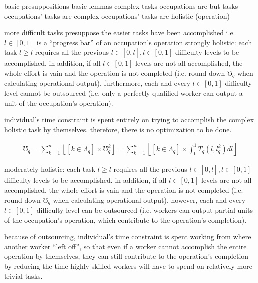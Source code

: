 \documentclass[hidelinks, nonatbib]{elsarticle}
\begin{document}
basic presuppositions
basic lemmas
complex tasks
occupations are but tasks
occupations' tasks are complex
occupations' tasks are holistic (operation)

more difficult tasks presuppose the easier tasks have been accomplished
i.e. $l \in [0,1]$ is a ``progress bar'' of an occupation's operation
strongly holistic: each task $l \geq \bar{l}$ requires all the previous $l \in [0, \bar{l}], \bar{l} \in [0,1]$ difficulty levels to be accomplished. in addition, if all $l \in [0,1]$ levels are not all accomplished, the whole effort is vain and the operation is not completed (i.e. round down $\mho_q$ when calculating operational output). furthermore, each and every $l \in [0,1]$ difficulty level cannot be outsourced (i.e. only a perfectly qualified worker can output a unit of the occupation's operation).

individual's time constraint is spent entirely on trying to accomplish the complex holistic task by themselves. therefore, there is no optimization to be done.

\begin{align*}
    \mho_q 
    = 
    \sum_{k=1}^{n}{
        \left\lfloor
            [k \in \Lambda_q]
            \times
            \mho_{q}^{k}
        \right\rfloor
    }
    = 
    \sum_{k=1}^{n}{
        \left\lfloor
            [k \in \Lambda_q]
            \times
            \int_{0}^{1}{
                T_{q}(l,l_{q}^{k})
                dl
            }
        \right\rfloor
    }
\end{align*}

moderately holistic: each task $l \geq \bar{l}$ requires all the previous $l \in [0, \bar{l}], \bar{l} \in [0,1]$ difficulty levels to be accomplished. in addition, if all $l \in [0,1]$ levels are not all accomplished, the whole effort is vain and the operation is not completed (i.e. round down $\mho_q$ when calculating operational output). however, each and every $l \in [0,1]$ difficulty level can be outsourced (i.e. workers can output partial units of the occupation's operation, which contribute to the operation's completion).
    
because of outsourcing, individual's time constraint is spent working from where another worker ``left off'', so that even if a worker cannot accomplish the entire operation by themselves, they can still contribute to the operation's completion by reducing the time highly skilled workers will have to spend on relatively more trivial tasks.
\end{document}
